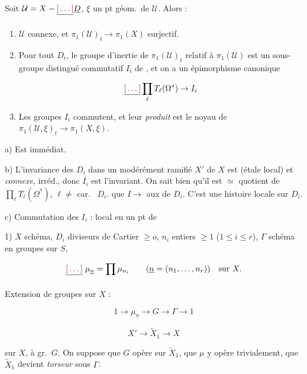 \documentclass[11pt,a4paper]{article}
\begin{document}
 Soit  $\mathcal{U} = X - \struck{\ill{}}
\uncertain{D}$, $\xi$ un pt géom.\ de $\mathcal{U}$. Alors :

\begin{enumerate}
\item[a)] $\mathcal{U}$ connexe, et $\pi_{1}(\mathcal{U})_{t} \to \pi_{1}(X)$
surjectif.
\item[b)] Pour tout $D_{i}$, le groupe d'inertie de $\pi_{1}(\mathcal{U})_{t}$
relatif à $\pi_{1}(\mathcal{U})$ est un sous-groupe distingué
 commutatif $I_{i}$ de \ill{} \struck{\ill{}}, et
on a un épimorphisme canonique

\[ \struck{\ill{}} \prod_{\ell} T_{\ell}(\Omega^{*}) \to I_{i} \]

\item[c)] Les groupes $I_{i}$ commutent, et leur \struck{\ill{}}
\emph{produit} est le noyau de $\pi_{1}(\mathcal{U}, \xi)_{t} \to
\pi_{1}(X, \xi)$.
\end{enumerate}

a) Est immédiat.

b) L'invariance des $D_{i}$ dans un \ill{} \struck{\ill{}} \ill{} modérément
ramifié $X'$ de $X$ est \ill{} (étale local) et \emph{connexe},
 irréd., donc $I_{i}$ est l'invariant. On sait bien
qu'il est $\simeq$ quotient de $\prod_{\ell} T_{\ell}(\Omega^{*})$, $\ell \neq$
car.\ \ill{} $D_{i}$.  \ill{} que $I \to$ \ill{} aux \ill{} de
$D_{i}$. C'est une histoire locale sur $D_{i}$.

c) Commutation des $I_{i}$ : \struck{\ill{}}  local en un pt de
\ill{}


1) $X$ schéma, $D_{i}$ diviseurs de Cartier $\geqslant o$, $n_{i}$ entiers
$\geqslant 1$ ($1 \leqslant i \leqslant r$), $\Gamma$ schéma en groupes sur $S$,

\[ \struck{\ill{}} \; \mu_{\underline{n}} = \prod \mu_{n_{i}} \qquad
(\underline{n} = (n_{1}, \ldots, n_{r})) \quad \text{sur } X. \]

Extension de groupes sur $X$ :

\[ 1 \to \mu_{\underline{n}} \to G \to \Gamma \to 1 \]

\[ X' \to \tilde{X}_{1} \to X \]

\ill{} \ill{} sur $X$, à gr.\ $G$. On suppose \ill{} que $G$ opère sur
$\tilde{X}_{1}$, que $\mu$ y opère trivialement, que \struck{\ill{}}
$\tilde{X}_{1}$ devient \emph{torseur} \ill{} sous $\Gamma$.
\end{document}
